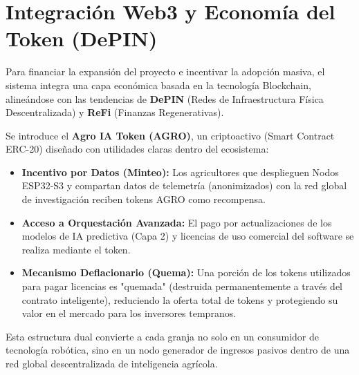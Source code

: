 \documentclass[12pt,a4paper]{article}
\begin{document}
\section{Integración Web3 y Economía del Token (DePIN)}
Para financiar la expansión del proyecto e incentivar la adopción masiva, el sistema integra una capa económica basada en la tecnología Blockchain, alineándose con las tendencias de \textbf{DePIN} (Redes de Infraestructura Física Descentralizada) y \textbf{ReFi} (Finanzas Regenerativas).

Se introduce el \textbf{Agro IA Token (AGRO)}, un criptoactivo (Smart Contract ERC-20) diseñado con utilidades claras dentro del ecosistema:
\begin{itemize}[label=$\bullet$]
    \item \textbf{Incentivo por Datos (Minteo):} Los agricultores que desplieguen Nodos ESP32-S3 y compartan datos de telemetría (anonimizados) con la red global de investigación reciben tokens AGRO como recompensa.
    \item \textbf{Acceso a Orquestación Avanzada:} El pago por actualizaciones de los modelos de IA predictiva (Capa 2) y licencias de uso comercial del software se realiza mediante el token.
    \item \textbf{Mecanismo Deflacionario (Quema):} Una porción de los tokens utilizados para pagar licencias es "quemada" (destruida permanentemente a través del contrato inteligente), reduciendo la oferta total de tokens y protegiendo su valor en el mercado para los inversores tempranos.
\end{itemize}

Esta estructura dual convierte a cada granja no solo en un consumidor de tecnología robótica, sino en un nodo generador de ingresos pasivos dentro de una red global descentralizada de inteligencia agrícola.
\end{document}
